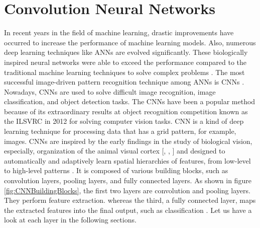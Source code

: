 \newpage

\section{Convolution Neural Networks}\label{CNNs}


In recent years in the field of machine learning, drastic improvements have occurred to increase the performance of machine learning models. Also, numerous deep learning techniques like \acp{ANN} are evolved significantly. These biologically inspired neural networks were able to exceed the performance compared to the traditional machine learning techniques to solve complex problems \cite{oshea2015introduction}. The most successful image-driven pattern recognition technique among \acp{ANN} is \acp{CNN} \cite{oshea2015introduction}. Nowadays, \acp{CNN} are used to solve difficult image recognition, image classification, and object detection tasks. The \acp{CNN} have been a popular method because of its extraordinary results at object recognition competition known as the \ac{ILSVRC} in 2012 for solving computer vision tasks. \ac{CNN} is a kind of deep learning technique for processing data that has a grid pattern, for example, images. \acp{CNN} are inspired by the early findings in the study of biological vision, especially, organization of the animal visual cortex [\cite{Hubel.1968}, \cite{Fukushima.1980}, \cite{10.5555/3153997}] and designed to automatically and adaptively learn spatial hierarchies of features, from low-level to high-level patterns \cite{10.5555/3153997}. It is composed of various building blocks, such as convolution layers, pooling layers, and fully connected layers. As shown in figure \ref{fig:CNNBuildingBlocks}, the first two layers are convolution and pooling layers. They perform feature extraction. whereas the third, a fully connected layer, maps the extracted features into the final output, such as classification \cite{articleCNNs}. Let us have a look at each layer in the following sections.




